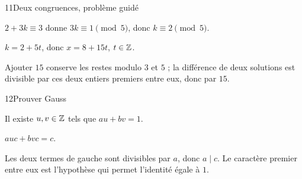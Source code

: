 \begin{corrige}{11}{Deux congruences, problème guidé}
\begin{questions}
\item $2+3k\equiv3$ donne $3k\equiv1\pmod5$, donc $k\equiv2\pmod5$.
\item $k=2+5t$, donc $x=8+15t$, $t\in\mathbb{Z}$.
\item Ajouter $15$ conserve les restes modulo $3$ et $5$ ; la différence de deux solutions est divisible par ces deux entiers premiers entre eux, donc par $15$.
\end{questions}
\end{corrige}
\begin{corrige}{12}{Prouver Gauss}
\begin{questions}
\item Il existe $u,v\in\mathbb{Z}$ tels que $au+bv=1$.
\item $auc+bvc=c$.
\item Les deux termes de gauche sont divisibles par $a$, donc $a\mid c$. Le caractère premier entre eux est l’hypothèse qui permet l’identité égale à $1$.
\end{questions}
\end{corrige}
